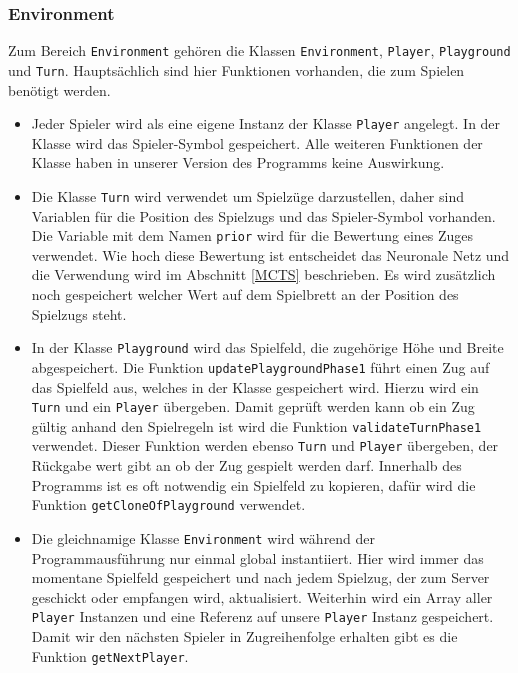 \documentclass[12pt,a4paper]{article}
\begin{document}
\subsubsection{Environment}
Zum Bereich \texttt{Environment} gehören die Klassen \texttt{Environment}, \texttt{Player}, \texttt{Playground} und \texttt{Turn}. Hauptsächlich sind hier Funktionen vorhanden, die zum Spielen benötigt werden.

\begin{itemize}

\item{Jeder Spieler wird als eine eigene Instanz der Klasse \texttt{Player} angelegt. In der Klasse wird das Spieler-Symbol gespeichert. Alle weiteren Funktionen der Klasse haben in unserer Version des Programms keine Auswirkung.}

\item{Die Klasse \texttt{Turn} wird verwendet um Spielzüge darzustellen, daher sind Variablen für die Position des Spielzugs und das Spieler-Symbol vorhanden. Die Variable mit dem Namen \texttt{prior} wird für die Bewertung eines Zuges verwendet. Wie hoch diese Bewertung ist entscheidet das Neuronale Netz und die Verwendung wird im Abschnitt \ref{MCTS} beschrieben. Es wird zusätzlich noch gespeichert welcher Wert auf dem Spielbrett an der Position des Spielzugs steht.}

\item{In der Klasse \texttt{Playground} wird das Spielfeld, die zugehörige Höhe und Breite abgespeichert. Die Funktion \texttt{updatePlaygroundPhase1} führt einen Zug auf das Spielfeld aus, welches in der Klasse gespeichert wird. Hierzu wird ein \texttt{Turn} und ein \texttt{Player} übergeben. Damit geprüft werden kann ob ein Zug gültig anhand den Spielregeln ist wird die Funktion \texttt{validateTurnPhase1} verwendet. Dieser Funktion werden ebenso \texttt{Turn} und \texttt{Player} übergeben, der Rückgabe wert gibt an ob der Zug gespielt werden darf. Innerhalb des Programms ist es oft notwendig ein Spielfeld zu kopieren, dafür wird die Funktion \texttt{getCloneOfPlayground} verwendet.}

\item{Die gleichnamige Klasse \texttt{Environment} wird während der Programmausführung nur einmal global instantiiert. Hier wird immer das momentane Spielfeld gespeichert und nach jedem Spielzug, der zum Server geschickt oder empfangen wird, aktualisiert. Weiterhin wird ein Array aller \texttt{Player} Instanzen und eine Referenz auf unsere \texttt{Player} Instanz gespeichert. Damit wir den nächsten Spieler in Zugreihenfolge erhalten gibt es die Funktion \texttt{getNextPlayer}.}

\end{itemize}
\end{document}
